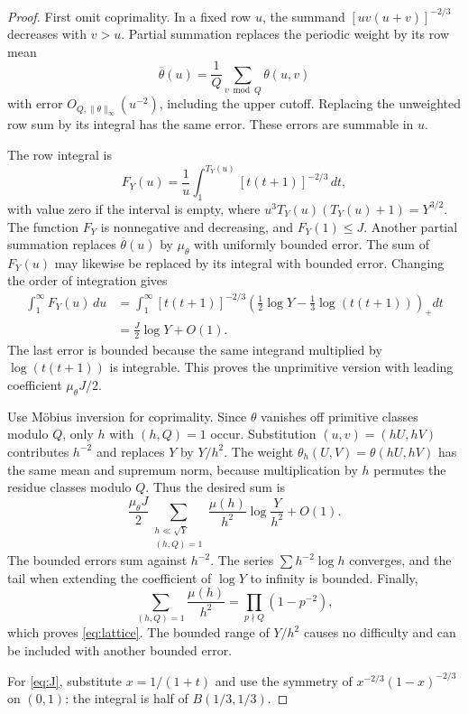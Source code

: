 \documentclass[11pt,a4paper]{article}
\numberwithin{equation}{section}
\theoremstyle{remark}
\begin{document}
\begin{proof}
First omit coprimality. In a fixed row $u$, the summand $[uv(u+v)]^{-2/3}$ decreases with $v>u$. Partial summation replaces the periodic weight by its row mean
\[
\overline\theta(u)=\frac1Q\sum_{v\bmod Q}\theta(u,v)
\]
with error $O_{Q,\|\theta\|_\infty}(u^{-2})$, including the upper cutoff. Replacing the unweighted row sum by its integral has the same error. These errors are summable in $u$.

The row integral is
\[
F_Y(u)=\frac1u\int_1^{T_Y(u)}[t(t+1)]^{-2/3}\,dt,
\]
with value zero if the interval is empty, where $u^3T_Y(u)(T_Y(u)+1)=Y^{3/2}$. The function $F_Y$ is nonnegative and decreasing, and $F_Y(1)\le J$. Another partial summation replaces $\overline\theta(u)$ by $\mu_\theta$ with uniformly bounded error. The sum of $F_Y(u)$ may likewise be replaced by its integral with bounded error. Changing the order of integration gives
\begin{align*}
\int_1^\infty F_Y(u)\,du
&=\int_1^\infty[t(t+1)]^{-2/3}
\left(\frac12\log Y-\frac13\log(t(t+1))\right)_+dt\\
&=\frac J2\log Y+O(1).
\end{align*}
The last error is bounded because the same integrand multiplied by $\log(t(t+1))$ is integrable. This proves the unprimitive version with leading coefficient $\mu_\theta J/2$.

Use M\"obius inversion for coprimality. Since $\theta$ vanishes off primitive classes modulo $Q$, only $h$ with $(h,Q)=1$ occur. Substitution $(u,v)=(hU,hV)$ contributes $h^{-2}$ and replaces $Y$ by $Y/h^2$. The weight $\theta_h(U,V)=\theta(hU,hV)$ has the same mean and supremum norm, because multiplication by $h$ permutes the residue classes modulo $Q$. Thus the desired sum is
\[
\frac{\mu_\theta J}{2}
\sum_{\substack{h\ll\sqrt Y\\(h,Q)=1}}\frac{\mu(h)}{h^2}\log\frac{Y}{h^2}+O(1).
\]
The bounded errors sum against $h^{-2}$. The series $\sum h^{-2}\log h$ converges, and the tail when extending the coefficient of $\log Y$ to infinity is bounded. Finally,
\[
\sum_{(h,Q)=1}\frac{\mu(h)}{h^2}=\prod_{p\nmid Q}(1-p^{-2}),
\]
which proves \eqref{eq:lattice}. The bounded range of $Y/h^2$ causes no difficulty and can be included with another bounded error.

For \eqref{eq:J}, substitute $x=1/(1+t)$ and use the symmetry of $x^{-2/3}(1-x)^{-2/3}$ on $(0,1)$: the integral is half of $B(1/3,1/3)$.
\end{proof}
\end{document}
